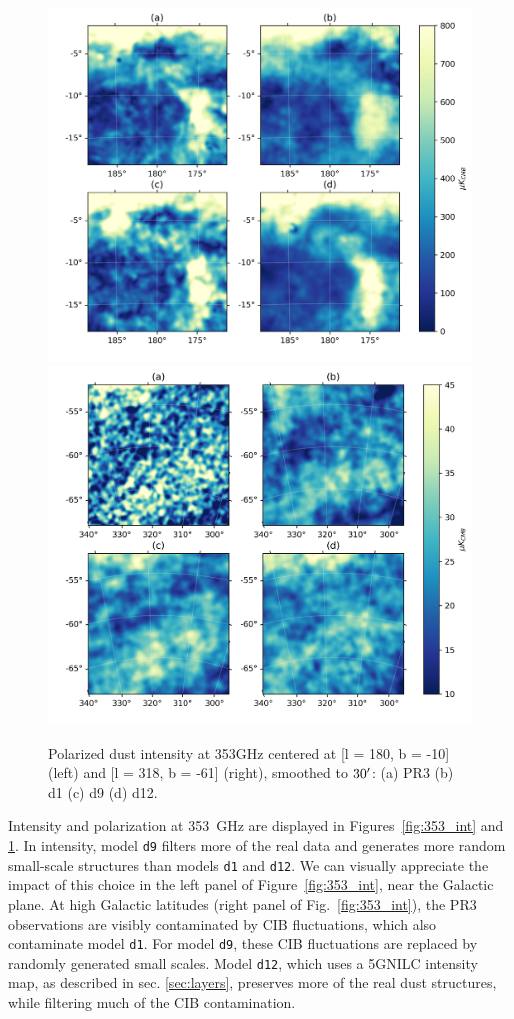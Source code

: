 \documentclass[twocolumn]{aastex631}
\begin{document}
\begin{figure}[t!]
    \centering
    \includegraphics[height=0.41\textwidth]{figures/pol_gal_plane_smooth_30'.png}
    \includegraphics[height=0.41\textwidth]{figures/pol_BK_smooth_30'.png}
    \caption{Polarized dust intensity at 353GHz centered at [l = 180, b = -10] (left) and [l = 318, b = -61] (right), smoothed to $30\mbox{$^\prime$}$: (a) PR3 (b) d1 (c) d9 (d) d12.}
    \label{fig:353_pol_int}
\end{figure}


Intensity and polarization at 353~GHz are displayed in Figures~\ref{fig:353_int} and \ref{fig:353_pol_int}. 
In intensity, model {\tt d9} filters more of the real data and generates more random small-scale structures than models {\tt d1} and {\tt d12}. We can visually appreciate the impact of this choice in the left panel of Figure~\ref{fig:353_int}, near the Galactic plane. At high Galactic latitudes (right panel of Fig.~\ref{fig:353_int}), the PR3 observations are visibly contaminated by CIB fluctuations, which also contaminate model {\tt d1}. For model {\tt d9}, these CIB fluctuations are replaced by randomly generated small scales. Model {\tt d12}, which uses a 5\arcmin GNILC intensity map, as described in sec. \ref{sec:layers}, preserves more of the real dust structures, while filtering much of the CIB contamination.
\end{document}
